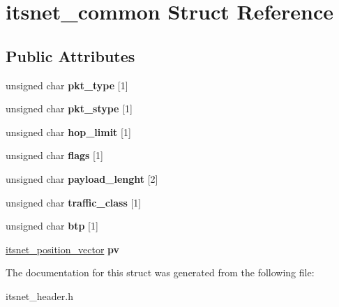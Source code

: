 \hypertarget{structitsnet__common}{\section{itsnet\-\_\-common \-Struct \-Reference}
\label{structitsnet__common}
}
\subsection*{\-Public \-Attributes}
\begin{DoxyCompactItemize}
\item 
\hypertarget{structitsnet__common_a3d4ee60ea13d1e012781d5cfc9dba50f}{unsigned char {\bfseries pkt\-\_\-type} \mbox{[}1\mbox{]}}\label{structitsnet__common_a3d4ee60ea13d1e012781d5cfc9dba50f}

\item 
\hypertarget{structitsnet__common_ae3dbe0d31d5ae09d3980b1f154ae5dc8}{unsigned char {\bfseries pkt\-\_\-stype} \mbox{[}1\mbox{]}}\label{structitsnet__common_ae3dbe0d31d5ae09d3980b1f154ae5dc8}

\item 
\hypertarget{structitsnet__common_ad9c86d3b1f66ba93fd2f70418c3658d8}{unsigned char {\bfseries hop\-\_\-limit} \mbox{[}1\mbox{]}}\label{structitsnet__common_ad9c86d3b1f66ba93fd2f70418c3658d8}

\item 
\hypertarget{structitsnet__common_a31d9a5efda32de6943c13ee80b880afe}{unsigned char {\bfseries flags} \mbox{[}1\mbox{]}}\label{structitsnet__common_a31d9a5efda32de6943c13ee80b880afe}

\item 
\hypertarget{structitsnet__common_ac81fd14016da0eeb8528f4e6cff50565}{unsigned char {\bfseries payload\-\_\-lenght} \mbox{[}2\mbox{]}}\label{structitsnet__common_ac81fd14016da0eeb8528f4e6cff50565}

\item 
\hypertarget{structitsnet__common_a1ca2c7f16041e13c3647e7ab35f7f851}{unsigned char {\bfseries traffic\-\_\-class} \mbox{[}1\mbox{]}}\label{structitsnet__common_a1ca2c7f16041e13c3647e7ab35f7f851}

\item 
\hypertarget{structitsnet__common_aedb9085ed0d087b059cb23774fe52d2b}{unsigned char {\bfseries btp} \mbox{[}1\mbox{]}}\label{structitsnet__common_aedb9085ed0d087b059cb23774fe52d2b}

\item 
\hypertarget{structitsnet__common_a070c8dffd7747c5672bfed8be28cf6b9}{\hyperlink{structitsnet__position__vector}{itsnet\-\_\-position\-\_\-vector} {\bfseries pv}}\label{structitsnet__common_a070c8dffd7747c5672bfed8be28cf6b9}

\end{DoxyCompactItemize}


\-The documentation for this struct was generated from the following file\-:\begin{DoxyCompactItemize}
\item 
itsnet\-\_\-header.\-h\end{DoxyCompactItemize}
